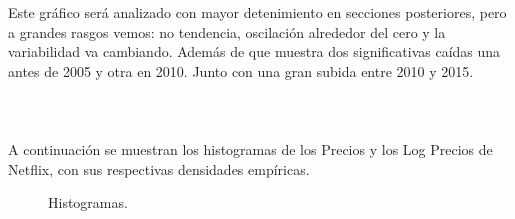 Este gráfico será analizado con mayor detenimiento en secciones posteriores, pero a grandes rasgos vemos: no tendencia, oscilación alrededor del cero y la variabilidad va cambiando. Además de que muestra dos significativas caídas una antes de 2005 y otra en 2010. Junto con una gran subida entre 2010 y 2015.  
\\\\
\\\\
A continuación se muestran los histogramas de los Precios y los Log Precios de Netflix, con sus respectivas densidades empíricas. 

\begin{figure}[htbp]
    \centering
    \vspace{10mm}
    \caption{Histogramas.} 
    \label{HistogramasPN.}
\end{figure}

